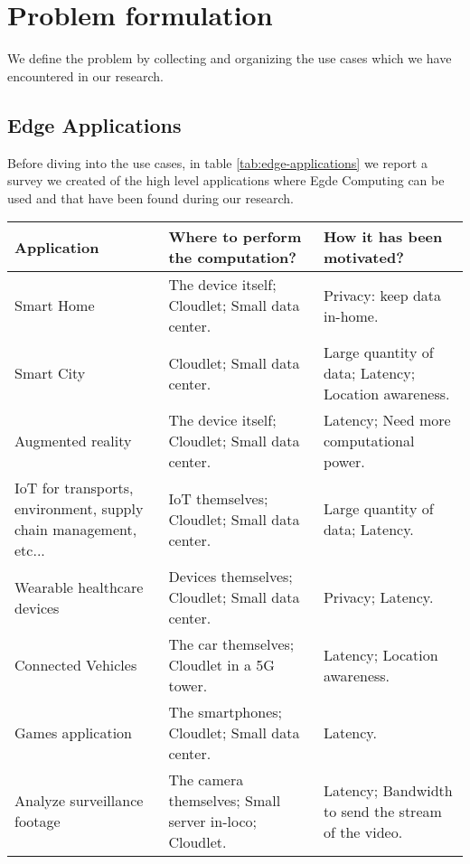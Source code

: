 \chapter{Problem formulation}
\label{ch:problem_formulation}

We define the problem by collecting and organizing the use cases which we have encountered in our research.


\section{Edge Applications}
Before diving into the use cases, in table \ref{tab:edge-applications} we report a survey we created of the high level applications where Egde Computing can be used and that have been found during our research.

\begin{tabularx}{\textwidth}{|X|X|X|}
\hline
\textbf{Application}            & \textbf{Where to perform the computation?}   & \textbf{How it has been motivated?}   \\ \hline \hline
Smart Home  \cite{edge-vision-and-challenges}    & The device itself; Cloudlet; Small data center.   & Privacy: keep data in-home.   \\ \hline
Smart City \cite{edge-vision-and-challenges} \cite{data-driven-stream}   & Cloudlet; Small data center.   & Large quantity of data; Latency; Location awareness.   \\ \hline
Augmented reality \cite{emergence-edge-computing}   & The device itself; Cloudlet; Small data center.   & Latency; Need more computational power.   \\ \hline
IoT for transports, environment, supply chain management, etc... \cite{lightweight-virtualization} & IoT themselves; Cloudlet; Small data center.   & Large quantity of data; Latency.   \\ \hline
Wearable healthcare devices \cite{mobile-edge-survey}   & Devices themselves; Cloudlet; Small data center.   & Privacy; Latency.   \\ \hline
Connected Vehicles \cite{mobile-edge-survey} \cite{emergence-edge-computing}   & The car themselves; Cloudlet in a 5G tower.   & Latency; Location awareness.   \\ \hline
Games application \cite{google-edge-for-mmog}   & The smartphones; Cloudlet; Small data center.   & Latency.   \\ \hline
Analyze surveillance footage \cite{mobile-edge-survey} \cite{emergence-edge-computing} \cite{promise-of-edge-computing}   & The camera themselves; Small server in-loco; Cloudlet.   & Latency; Bandwidth to send the stream of the video.   \\ \hline

\end{tabularx}
